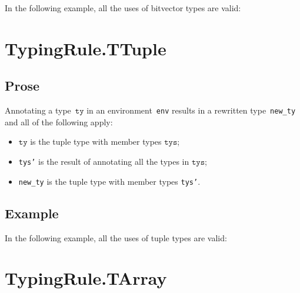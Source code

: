 \documentclass{book}
\newcommand\tty[0]{\texttt{ty}}
\newcommand\tys[0]{\texttt{tys}}
\begin{document}
\begin{itemize}
In the following example, all the uses of bitvector types are valid:




\section{TypingRule.TTuple \label{sec:TypingRule.TTuple}}

\subsection{Prose}
Annotating a type~$\tty$ in an environment~\texttt{env} results in a
rewritten type~\texttt{new\_ty} and all of the following apply:
\begin{itemize}
  \item $\tty$ is the tuple type with member types $\tys$;
  \item \texttt{tys'} is the result of annotating all the types in
    $\tys$;
  \item \texttt{new\_ty} is the tuple type with member types \texttt{tys'}.
\end{itemize}

\subsection{Example}
In the following example, all the uses of tuple types are valid:







\section{TypingRule.TArray \label{sec:TypingRule.TArray}}


\end{itemize}
\end{document}
